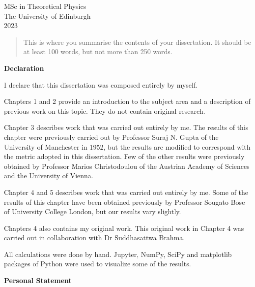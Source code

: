 \documentclass[12pt,a4paper]{report}
\theoremstyle{plain}
\theoremstyle{definition}
\theoremstyle{remark}
\begin{document}
\medskip

\begin{center}

\large{
  MSc in Theoretical Physics\\[0.8ex]
  The University of Edinburgh\\[0.8ex]
  2023}

\end{center}
\newpage
{}

\begin{abstract}
This is where you summarise the contents of your dissertation. It should be
at least 100 words, but not more than 250 words.
\end{abstract}


\begin{center}
\textbf{Declaration}
\end{center}

I declare that this dissertation was composed entirely by myself.

Chapters 1 and 2 provide an introduction to the subject area and a
description of previous work on this topic. They do not contain
original research.

Chapter 3 describes work that was carried out entirely by me. The results of this chapter were previously carried out by Professor Suraj N. Gupta of the University of Manchester in 1952, but the results are modified to correspond with the metric adopted in this dissertation. Few of the other results were previously obtained by Professor Marios Christodoulou of the Austrian Academy of Sciences and the University of Vienna. 

Chapter 4 and 5 describes work that was carried out entirely by me. Some of the results of this chapter have been obtained previously by Professor Sougato Bose of University College London, but our results vary slightly.

Chapters 4 also contains my original work. This original work in
Chapter 4 was carried out in collaboration with Dr Suddhasattwa Brahma.

All calculations were done by hand. Jupyter, NumPy, SciPy and matplotlib packages of Python were used to visualize some of the results.

\newpage

\begin{center}
\textbf{Personal Statement}
\end{center}
\end{document}
